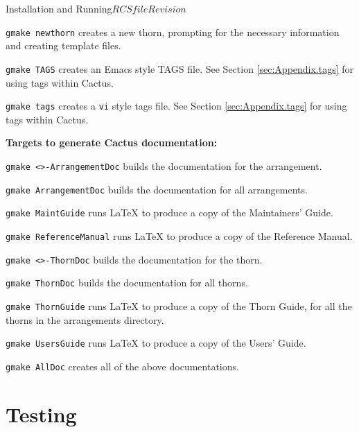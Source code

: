 \begin{cactuspart}{Installation and Running}{$RCSfile$}{$Revision$}
\begin{Lentry}
\item [\texttt{gmake newthorn}] creates a new thorn, prompting for the necessary
  information and creating template files.

\item [\texttt{gmake TAGS}] creates an Emacs style TAGS file. See Section
  \ref{sec:Appendix.tags} for using tags within Cactus.

\item [\texttt{gmake tags}] creates a \texttt{vi} style tags file. See Section
  \ref{sec:Appendix.tags} for using tags within Cactus.

\end{Lentry}

{\bf Targets to generate Cactus documentation:}
\label{sec:OtherGmakeTargetsDoc}

\begin{Lentry}

\item[\texttt{gmake <\var{arrangement}>-ArrangementDoc}] builds the
documentation for the arrangement.

\item[\texttt{gmake ArrangementDoc}] builds the documentation for all
arrangements.

\item [\texttt{gmake MaintGuide}] runs LaTeX to produce a copy of the
Maintainers' Guide.

\item [\texttt{gmake ReferenceManual}] runs LaTeX to produce a copy of the
Reference Manual.

\item[\texttt{gmake <\var{thorn}>-ThornDoc}] builds the documentation for the
thorn.

\item[\texttt{gmake ThornDoc}] builds the documentation for all thorns.

\item [\texttt{gmake ThornGuide}] runs LaTeX to produce a copy of the Thorn
Guide, for all the thorns in the arrangements directory.

\item [\texttt{gmake UsersGuide}] runs LaTeX to produce a copy of the Users'
Guide.

\item [\texttt{gmake AllDoc}] creates all of the above documentations.

\end{Lentry}


\section{Testing}
\label{sec:testing}


\end{cactuspart}
